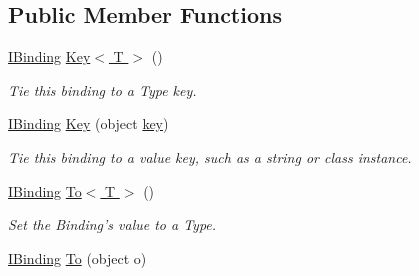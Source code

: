 \subsection*{Public Member Functions}
\begin{DoxyCompactItemize}
\item 
\hypertarget{interfacestrange_1_1framework_1_1api_1_1_i_binding_a5d2449e53a2565acce7e4c8d753142b0}{\hyperlink{interfacestrange_1_1framework_1_1api_1_1_i_binding}{I\-Binding} \hyperlink{interfacestrange_1_1framework_1_1api_1_1_i_binding_a5d2449e53a2565acce7e4c8d753142b0}{Key$<$ T $>$} ()}\label{interfacestrange_1_1framework_1_1api_1_1_i_binding_a5d2449e53a2565acce7e4c8d753142b0}

\begin{DoxyCompactList}\small\item\em Tie this binding to a Type key. \end{DoxyCompactList}\item 
\hypertarget{interfacestrange_1_1framework_1_1api_1_1_i_binding_a255d141164f15e7d1f6ba9a9d932da90}{\hyperlink{interfacestrange_1_1framework_1_1api_1_1_i_binding}{I\-Binding} \hyperlink{interfacestrange_1_1framework_1_1api_1_1_i_binding_a255d141164f15e7d1f6ba9a9d932da90}{Key} (object \hyperlink{interfacestrange_1_1framework_1_1api_1_1_i_binding_acec8686208598f9f4a952ffd05449c4d}{key})}\label{interfacestrange_1_1framework_1_1api_1_1_i_binding_a255d141164f15e7d1f6ba9a9d932da90}

\begin{DoxyCompactList}\small\item\em Tie this binding to a value key, such as a string or class instance. \end{DoxyCompactList}\item 
\hypertarget{interfacestrange_1_1framework_1_1api_1_1_i_binding_a11058132bdc6b6eb7a9a258caa5e5abb}{\hyperlink{interfacestrange_1_1framework_1_1api_1_1_i_binding}{I\-Binding} \hyperlink{interfacestrange_1_1framework_1_1api_1_1_i_binding_a11058132bdc6b6eb7a9a258caa5e5abb}{To$<$ T $>$} ()}\label{interfacestrange_1_1framework_1_1api_1_1_i_binding_a11058132bdc6b6eb7a9a258caa5e5abb}

\begin{DoxyCompactList}\small\item\em Set the Binding's value to a Type. \end{DoxyCompactList}\item 
\hypertarget{interfacestrange_1_1framework_1_1api_1_1_i_binding_a4f7d063a91e5e6dcadc0c4854b010517}{\hyperlink{interfacestrange_1_1framework_1_1api_1_1_i_binding}{I\-Binding} \hyperlink{interfacestrange_1_1framework_1_1api_1_1_i_binding_a4f7d063a91e5e6dcadc0c4854b010517}{To} (object o)}\label{interfacestrange_1_1framework_1_1api_1_1_i_binding_a4f7d063a91e5e6dcadc0c4854b010517}


\end{DoxyCompactItemize}
